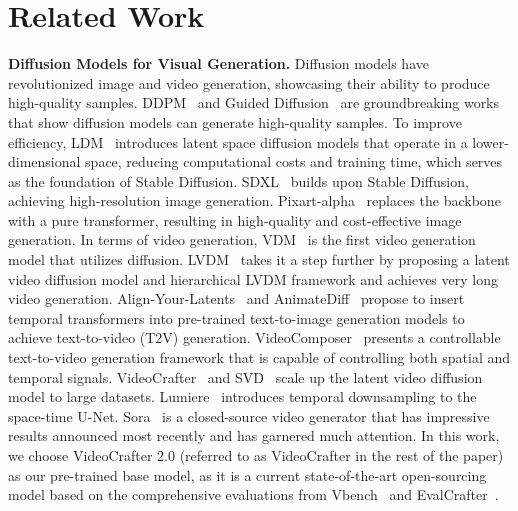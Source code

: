 \section{Related Work}
\label{relatedwork}

\noindent\textbf{Diffusion Models for Visual Generation.}
%
Diffusion models have revolutionized image and video generation, showcasing their ability to produce high-quality samples. 
DDPM~\citep{ddpm} and Guided Diffusion~\citep{guided-diffusion} are groundbreaking works that show diffusion models can generate high-quality samples.
%
To improve efficiency, LDM~\citep{ldm} introduces latent space diffusion models that operate in a lower-dimensional space, reducing computational costs and training time, which serves as the foundation of Stable Diffusion. 
%
SDXL~\citep{sdxl} builds upon Stable Diffusion, achieving high-resolution image generation. 
%
Pixart-alpha~\citep{pixart-alpha} replaces the backbone with a pure transformer, resulting in high-quality and cost-effective image generation.
%
In terms of video generation, VDM~\citep{vdm} is the first video generation model that utilizes diffusion.
LVDM~\citep{lvdm} takes it a step further by proposing a latent video diffusion model and hierarchical LVDM framework and achieves very long video generation.
Align-Your-Latents~\citep{blattmann2023align} and AnimateDiff~\citep{guo2023animatediff} propose to insert temporal transformers into pre-trained text-to-image generation models to achieve text-to-video (T2V) generation.
VideoComposer~\citep{videocomposer} presents a controllable text-to-video generation framework that is capable of controlling both spatial and temporal signals.
VideoCrafter~\citep{chen2023videocrafter1, chen2024videocrafter2} and SVD~\citep{svd} scale up the latent video diffusion model to large datasets.
Lumiere~\citep{lumiere} introduces temporal downsampling to the space-time U-Net.
Sora~\citep{sora} is a closed-source video generator that has impressive results announced most recently and has garnered much attention.
In this work, we choose VideoCrafter 2.0 (referred to as VideoCrafter in the rest of the paper) as our pre-trained base model, as it is a current state-of-the-art open-sourcing model based on the comprehensive evaluations from Vbench~\citep{vbench} and EvalCrafter~\citep{liu2023evalcrafter}.


